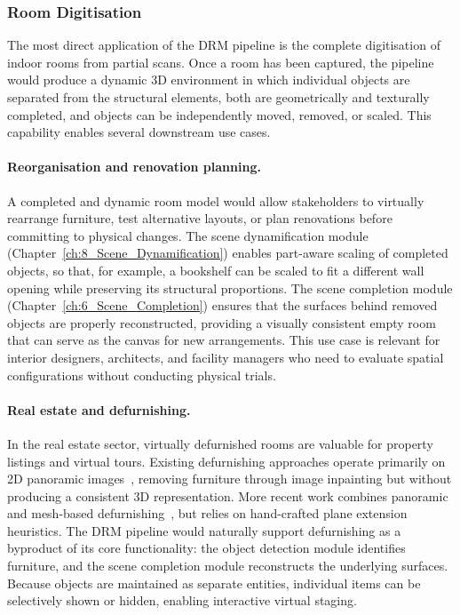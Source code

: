 \subsubsection{Room Digitisation}
\label{sec:val_room}

The most direct application of the DRM pipeline is the complete digitisation of indoor rooms from partial scans. Once a room has been captured, the pipeline would produce a dynamic 3D environment in which individual objects are separated from the structural elements, both are geometrically and texturally completed, and objects can be independently moved, removed, or scaled. This capability enables several downstream use cases.

\paragraph{Reorganisation and renovation planning.} A completed and dynamic room model would allow stakeholders to virtually rearrange furniture, test alternative layouts, or plan renovations before committing to physical changes. The scene dynamification module (Chapter~\ref{ch:8_Scene_Dynamification}) enables part-aware scaling of completed objects, so that, for example, a bookshelf can be scaled to fit a different wall opening while preserving its structural proportions. The scene completion module (Chapter~\ref{ch:6_Scene_Completion}) ensures that the surfaces behind removed objects are properly reconstructed, providing a visually consistent empty room that can serve as the canvas for new arrangements. This use case is relevant for interior designers, architects, and facility managers who need to evaluate spatial configurations without conducting physical trials.

\paragraph{Real estate and defurnishing.} In the real estate sector, virtually defurnished rooms are valuable for property listings and virtual tours. Existing defurnishing approaches operate primarily on 2D panoramic images~\cite{slavcheva_empty_2024, gkitsas_panodr_2021}, removing furniture through image inpainting but without producing a consistent 3D representation. More recent work combines panoramic and mesh-based defurnishing~\cite{dolhasz_defurnishing_2025}, but relies on hand-crafted plane extension heuristics. The DRM pipeline would naturally support defurnishing as a byproduct of its core functionality: the object detection module identifies furniture, and the scene completion module reconstructs the underlying surfaces. Because objects are maintained as separate entities, individual items can be selectively shown or hidden, enabling interactive virtual staging.

